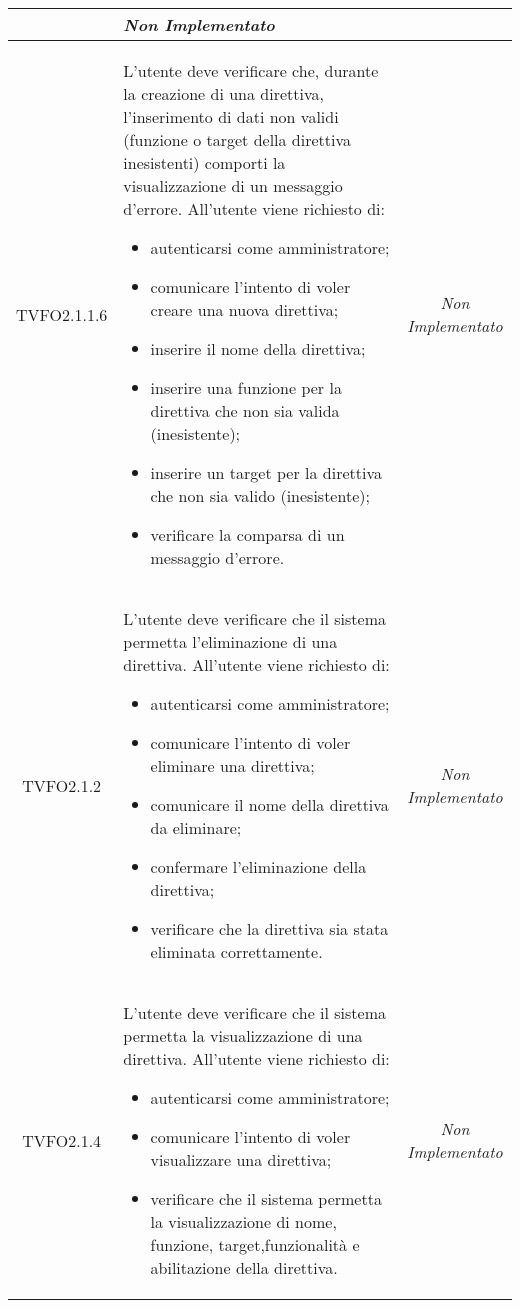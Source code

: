 \begin{longtable}{|c|>{}m{8cm}|c|}
\begin{itemize}
\end{itemize}
 & \textit{Non Implementato}\\ \hline
\hypertarget{TVFO2.1.1.6}{TVFO2.1.1.6} & L'utente deve verificare che, durante la creazione di una direttiva, l'inserimento di dati non validi (funzione o target della direttiva inesistenti) comporti la visualizzazione di un messaggio d'errore. All'utente viene richiesto di:
\begin{itemize}
\item autenticarsi come amministratore;
\item comunicare l'intento di voler creare una nuova direttiva;
\item inserire il nome della direttiva;
\item inserire una funzione per la direttiva che non sia valida (inesistente);
\item inserire un target per la direttiva che non sia valido (inesistente);
\item verificare la comparsa di un messaggio d'errore.
\end{itemize} & \textit{Non Implementato}\\ \hline
\hypertarget{TVFO2.1.2}{TVFO2.1.2} & L'utente deve verificare che il sistema permetta l'eliminazione di una direttiva. All'utente viene richiesto di:
\begin{itemize}
\item autenticarsi come amministratore;
\item comunicare l'intento di voler eliminare una direttiva;
\item comunicare il nome della direttiva da eliminare;
\item confermare l'eliminazione della direttiva;
\item verificare che la direttiva sia stata eliminata correttamente.
\end{itemize}
 & \textit{Non Implementato}\\ \hline
\hypertarget{TVFO2.1.4}{TVFO2.1.4} & L'utente deve verificare che il sistema permetta la visualizzazione di una direttiva. All'utente viene richiesto di:
\begin{itemize}
\item autenticarsi come amministratore;
\item comunicare l'intento di voler visualizzare una direttiva;
\item verificare che il sistema permetta la visualizzazione di nome, funzione, target,funzionalità e abilitazione della direttiva.
\end{itemize} & \textit{Non Implementato}\\ \hline

\end{longtable}
